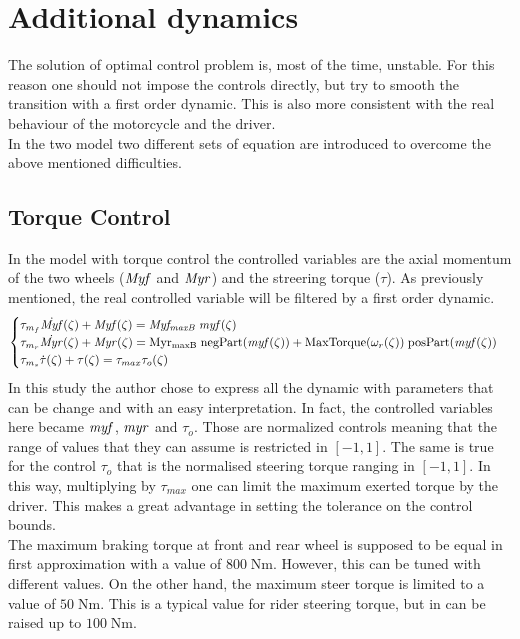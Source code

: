 \section{Additional dynamics}
\label{sec:AddDyn}
%
The solution of optimal control problem is, most of the time, unstable. For this reason one should not impose the controls directly, but try to smooth the transition with a first order dynamic. This is also more consistent with the real behaviour of the motorcycle and the driver.\\
In the two model two different sets of equation are introduced to overcome the above mentioned difficulties.
%
\subsection{Torque Control}
%
In the model with torque control the controlled variables are the axial momentum of the two wheels ($\it Myf$ and $\it Myr$) and the streering torque ($\tau$). As previously mentioned, the real controlled variable will be filtered by a first order dynamic. 
%
\begin{equation}
    \begin{cases}
        \tau_{m_f} \dot{{\it Myf}}(\zeta) + {\it Myf}(\zeta) = {\it Myf_{maxB}} \; {\it myf}(\zeta)\\
        \tau_{m_r} \dot{{\it Myr}}(\zeta) + {\it Myr}(\zeta) = \mathrm{Myr_{maxB}} \; \mathrm{negPart}({\it myf}(\zeta)) + \mathrm{MaxTorque}(\omega_r(\zeta)) \; \mathrm{posPart}({\it myf}(\zeta)) \\
        \tau_{m_s} \dot{\tau}(\zeta) + \tau(\zeta) = \tau_{max} \tau_o(\zeta)
    \end{cases}
    \label{eq:AddDynaT}
\end{equation}
%
In this study the author chose to express all the dynamic with parameters that can be change and with an easy interpretation. In fact, the controlled variables here became ${\it myf}$, ${\it myr}$ and $\tau_o$. Those are normalized controls meaning that the range of values that they can assume is restricted in $[-1,1]$. The same is true for the control $\tau_o$ that is the normalised steering torque ranging in $[-1,1]$. In this way, multiplying by $\tau_{max}$ one can limit the maximum exerted torque by the driver. This makes a great advantage in setting the tolerance on the control bounds.\\
The maximum braking torque at front and rear wheel is supposed to be equal in first approximation with a value of $800 \; \si{\newton\metre}$. However, this can be tuned with different values. On the other hand, the maximum steer torque is limited to a value of $50 \; \si{\newton\metre}$. This is a typical value for rider steering torque, but in can be raised up to $100 \; \si{\newton\metre}$.\\
